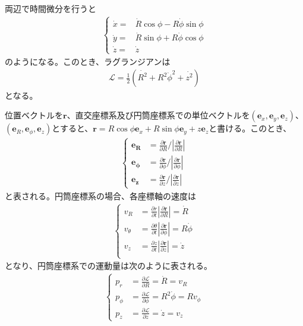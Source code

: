 両辺で時間微分を行うと
\begin{align}
	\begin{cases}
		\dot{x} =& \dot{R}\cos\phi - R\dot{\phi}\sin\phi \\
		\dot{y} =& \dot{R}\sin\phi + R\dot{\phi}\cos\phi \\
		\dot{z} =& \dot{z}
	\end{cases}
\end{align}
のようになる。このとき、ラグランジアンは
\begin{align}
	\mathcal{L} = \frac{1}{2}(\dot{R^2} + R^2\dot{\phi}^2 + \dot{z^2})
\end{align}
となる。

位置ベクトルを$\bm r$、直交座標系及び円筒座標系での単位ベクトルを$(\bm e_x, \bm e_y, \bm e_z)$、$(\bm e_R, \bm e_{\phi}, \bm e_z)$とすると、$\bm r = R\cos\phi \bm e_x + R\sin\phi \bm e_y + z \bm e_z$と書ける。このとき、
\begin{align}
	\begin{cases}
		\bm{e_R} &= \frac{\partial \bm r}{\partial R} / \left| \frac{\partial \bm r}{\partial R}\right| \\
		\bm{e_{\phi}} &= \frac{\partial \bm r}{\partial \phi} / \left| \frac{\partial \bm r}{\partial \phi}\right| \\
		\bm{e_z} &= \frac{\partial \bm r}{\partial z} / \left| \frac{\partial \bm r}{\partial z}\right|
	\end{cases}
\end{align}
と表される。円筒座標系の場合、各座標軸の速度は
\begin{align}
	\begin{cases}
		v_R &= \frac{\partial r}{\partial t}|\frac{\partial \bm r}{\partial R}| = \dot{R}\\
		v_{\theta} &= \frac{\partial \theta}{\partial t}|\frac{\partial \bm r}{\partial \phi}| = R\dot{\phi}\\
		v_z &= \frac{\partial z}{\partial t}|\frac{\partial \bm r}{\partial z}| = \dot{z} \\
	\end{cases}
\end{align}
となり、円筒座標系での運動量は次のように表される。
\begin{align}
	\begin{cases}
		p_r &= \frac{\partial \mathcal{L}}{\partial R} = \dot{R} = v_R \\
		p_{\phi} &= \frac{\partial \mathcal{L}}{\partial \phi} = R^2\dot{\phi} = R v_{\phi} \\
		p_z &= \frac{\partial \mathcal{L}}{\partial z} = \dot{z} =  v_z \label{momenta_Cylindrical}
	\end{cases}
\end{align}
